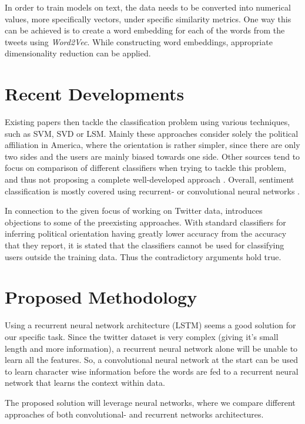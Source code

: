 \documentclass[10pt, oneside]{article}
\begin{document}
\begin{multicols}{2}
In order to train models on text, the data needs to be converted into numerical values, more specifically vectors, under specific similarity metrics. One way this can be achieved is to create a word embedding for each of the words from the tweets using \textit{Word2Vec}. While constructing word embeddings, appropriate dimensionality reduction can be applied.


\section{Recent Developments}

Existing papers \cite{Misra20XX} then tackle the classification problem using various techniques, such as SVM, SVD or LSM. Mainly these approaches consider solely the political affiliation in America, where the orientation is rather simpler, since there are only two sides and the users are mainly biased towards one side. 
Other sources tend to focus on comparison of different classifiers when trying to tackle this problem, and thus not proposing a complete well-developed approach \cite{Bhanda2009}.
Overall, sentiment classification is mostly covered using recurrent- or convolutional neural networks \cite{Kim2014}.

In connection to the given focus of working on Twitter data, \cite{Cohen20XX} introduces objections to some of the preexisting approaches. With standard classifiers for inferring political orientation having greatly lower accuracy from the accuracy that they report, it is stated that the classifiers cannot be used for classifying users outside the training data. Thus the contradictory arguments hold true.

\section{Proposed Methodology}

Using a recurrent neural network architecture (LSTM) seems a good solution for our specific task. Since the twitter dataset is very complex (giving it's small length and more information), a recurrent neural network alone will be unable to learn all the features. So, a convolutional neural network at the start can be used to learn character wise information before the words are fed to a recurrent neural network that learns the context within data.

The proposed solution will leverage neural networks, where we compare different approaches of both convolutional- and recurrent networks architectures.



\end{multicols}
\end{document}
